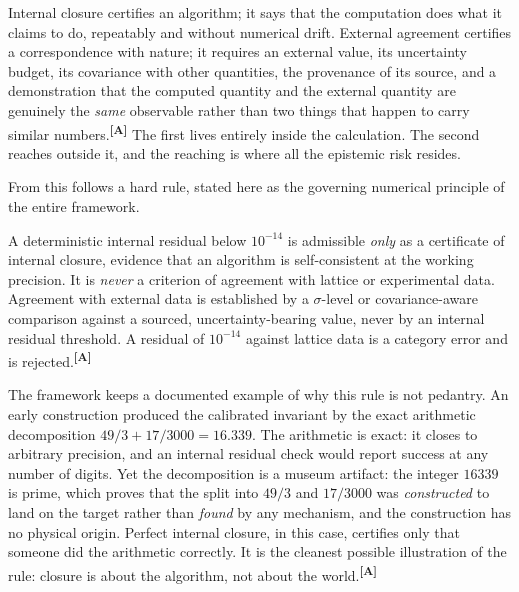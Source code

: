 \documentclass[12pt,a4paper,twoside]{article}
\theoremstyle{plain}
\theoremstyle{definition}
\theoremstyle{remark}
\newcommand{\catmark}[1]{\textsuperscript{\textsf{\textbf{[#1]}}}}
\begin{document}
Internal closure certifies an algorithm; it says that the computation does what it claims to do, repeatably and without numerical drift. External agreement certifies a correspondence with nature; it requires an external value, its uncertainty budget, its covariance with other quantities, the provenance of its source, and a demonstration that the computed quantity and the external quantity are genuinely the \emph{same} observable rather than two things that happen to carry similar numbers.\catmark{A} The first lives entirely inside the calculation. The second reaches outside it, and the reaching is where all the epistemic risk resides.

From this follows a hard rule, stated here as the governing numerical principle of the entire framework.

\begin{governancebox}
A deterministic internal residual below $10^{-14}$ is admissible \emph{only} as a certificate of internal closure, evidence that an algorithm is self-consistent at the working precision. It is \emph{never} a criterion of agreement with lattice or experimental data. Agreement with external data is established by a $\sigma$-level or covariance-aware comparison against a sourced, uncertainty-bearing value, never by an internal residual threshold. A residual of $10^{-14}$ against lattice data is a category error and is rejected.\catmark{A}
\end{governancebox}

\noindent The framework keeps a documented example of why this rule is not pedantry. An early construction produced the calibrated invariant by the exact arithmetic decomposition $49/3 + 17/3000 = 16.339$. The arithmetic is exact: it closes to arbitrary precision, and an internal residual check would report success at any number of digits. Yet the decomposition is a museum artifact: the integer $16339$ is prime, which proves that the split into $49/3$ and $17/3000$ was \emph{constructed} to land on the target rather than \emph{found} by any mechanism, and the construction has no physical origin. Perfect internal closure, in this case, certifies only that someone did the arithmetic correctly. It is the cleanest possible illustration of the rule: closure is about the algorithm, not about the world.\catmark{A}
\end{document}
